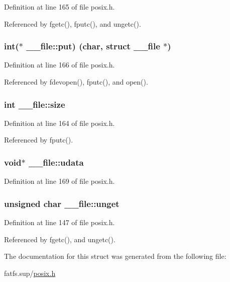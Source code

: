 Definition at line 165 of file posix.\+h.



Referenced by fgetc(), fputc(), and ungetc().

\subsubsection[{\texorpdfstring{put}{put}}]{\setlength{\rightskip}{0pt plus 5cm}int($\ast$ \+\_\+\+\_\+file\+::put) (char, struct {\bf \+\_\+\+\_\+file} $\ast$)}\hypertarget{struct____file_a01c8b217e42cc11b6a7f8429114e9d46}{}\label{struct____file_a01c8b217e42cc11b6a7f8429114e9d46}


Definition at line 166 of file posix.\+h.



Referenced by fdevopen(), fputc(), and open().

\subsubsection[{\texorpdfstring{size}{size}}]{\setlength{\rightskip}{0pt plus 5cm}int \+\_\+\+\_\+file\+::size}\hypertarget{struct____file_aff4a1ca8b6a12460812928afae81248d}{}\label{struct____file_aff4a1ca8b6a12460812928afae81248d}


Definition at line 164 of file posix.\+h.



Referenced by fputc().

\subsubsection[{\texorpdfstring{udata}{udata}}]{\setlength{\rightskip}{0pt plus 5cm}void$\ast$ \+\_\+\+\_\+file\+::udata}\hypertarget{struct____file_abe6f3bdb4df4119277132eb3e13a4628}{}\label{struct____file_abe6f3bdb4df4119277132eb3e13a4628}


Definition at line 169 of file posix.\+h.

\subsubsection[{\texorpdfstring{unget}{unget}}]{\setlength{\rightskip}{0pt plus 5cm}unsigned char \+\_\+\+\_\+file\+::unget}\hypertarget{struct____file_a1d139ae3cb11a1fada469a49f7d3d3b6}{}\label{struct____file_a1d139ae3cb11a1fada469a49f7d3d3b6}


Definition at line 147 of file posix.\+h.



Referenced by fgetc(), and ungetc().



The documentation for this struct was generated from the following file\+:\begin{DoxyCompactItemize}
\item 
fatfs.\+sup/\hyperlink{posix_8h}{posix.\+h}\end{DoxyCompactItemize}
